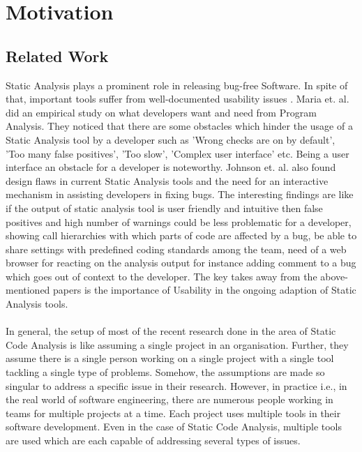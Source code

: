 \chapter{Motivation}
\label{ch:motivation}

\section{Related Work}

Static Analysis plays a prominent role in releasing bug-free Software. In spite of that, important tools suffer from well-documented usability issues \cite{CB16,JSMB13}.  Maria et. al. \cite{CB16} did an empirical study on what developers want and need from Program Analysis. They noticed that there are some obstacles which hinder the usage of a Static Analysis tool by a developer such as 'Wrong checks are on by default', 'Too many false positives', 'Too slow',  'Complex user interface' etc. Being a user interface an obstacle for a developer is noteworthy. Johnson et. al. \cite{JSMB13} also found design flaws in current Static Analysis tools and the need for an interactive mechanism in assisting developers in fixing bugs. The interesting findings are like if the output of static analysis tool is user friendly and intuitive then false positives and high number of warnings could be less problematic for a developer, showing call hierarchies with which parts of code are affected by a bug, be able to share settings with predefined coding standards among the team, need of a web browser for reacting on the analysis output for instance adding comment to a bug which goes out of context to the developer. The key takes away from the above-mentioned papers is the importance of Usability in the ongoing adaption of Static Analysis tools. \\ \\ 

In general, the setup of most of the recent research \cite{CB16} \cite{JSMB13} done in the area of Static Code Analysis is like assuming a single project in an organisation. Further, they assume there is a single person working on a single project with a single tool tackling a single type of problems.  Somehow, the assumptions are made so singular to address a specific issue in their research. However, in practice i.e., in the real world of software engineering, there are numerous people working in teams for multiple projects at a time. Each project uses multiple tools in their software development. Even in the case of Static Code Analysis, multiple tools are used which are each capable of addressing several types of issues. \\ \\

